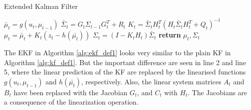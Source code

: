 \begin{center}
\begin{minipage}{.65\linewidth}
\begin{algorithm}[H]
\caption{Extended Kalman Filter}
\label{alg:ekf_def1}
\begin{algorithmic}[1]
  \State $\bar\mu_{t} = g(u_t,\mu_{t-1})$
  \State $\bar\Sigma_{t} = G_{t}\Sigma_{t-1}G_{t}^T + R_{t}$
  \State $K_{t} = \bar\Sigma_{t}H_{t}^T(H_{t}\bar{\Sigma}_{t}H_{t}^T+Q_{t})^{-1}$
  \State $\mu_{t} = \bar\mu_{t} + K_{t}(z_{t} - h(\bar{\mu_t}))$
  \State $\Sigma_{t} = (I - K_{t}H_{t})\bar\Sigma_{t}$
  \State \textbf{return} $\mu_{t}, \Sigma_{t}$
\EndProcedure
\end{algorithmic}
\end{algorithm}
\end{minipage}
\end{center}

The EKF in Algorithm \ref{alg:ekf_def1} looks very similar to the plain KF in Algorithm \ref{alg:kf_def1}. But the important difference are seen in line 2 and line 5, where the linear prediction of the KF are replaced by the linearised functions $g(u_t,\mu_{t-1})$ and $h(\bar{\mu_t})$, respectively. Also, the linear system matrices $A_t$ and $B_t$ have been replaced with the Jacobian $G_t$, and $C_t$ with $H_t$. The Jacobians are a consequence of the linearization operation.
